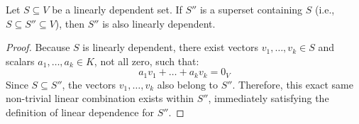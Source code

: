 \begin{lemma}
Let $S \subseteq V$ be a linearly dependent set. If $S''$ is a superset containing $S$ (i.e., $S \subseteq S'' \subseteq V$), then $S''$ is also linearly dependent.
\end{lemma}

\begin{proof}
Because $S$ is linearly dependent, there exist vectors $v_1, \dots, v_k \in S$ and scalars $a_1, \dots, a_k \in K$, not all zero, such that:
\[
a_1 v_1 + \dots + a_k v_k = 0_V
\]
Since $S \subseteq S''$, the vectors $v_1, \dots, v_k$ also belong to $S''$. Therefore, this exact same non-trivial linear combination exists within $S''$, immediately satisfying the definition of linear dependence for $S''$. 
\end{proof}